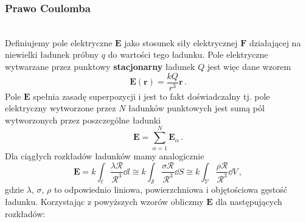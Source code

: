 \documentclass[../main.tex]{subfiles}
\begin{document}
\subsubsection{Prawo Coulomba}
\noindent{}\\

Definiujemy pole elektryczne \(\mathbf{E}\) jako stosunek siły elektrycznej \(\mathbf{F}\) działającej na niewielki ładunek próbny \(q\) do wartości tego ładunku. Pole elektryczne wytwarzane przez punktowy \textbf{stacjonarny} ładunek \(Q\) jest więc dane wzorem
\begin{equation*}
    \mathbf{E}(\mathbf{r})=\frac{kQ}{r^3}\mathbf{r}\,.
\end{equation*}
Pole \(\mathbf{E}\) spełnia zasadę superpozycji i jest to fakt doświadczalny tj. pole elektryczny wytworzone przez \(N\) ładunków punktowych jest sumą pól wytworzonych przez poszczególne ładunki
\begin{equation*}
    \mathbf{E}=\sum_{\alpha=1}^N\mathbf{E}_\alpha \,.
\end{equation*}
Dla ciągłych rozkładów ładunków mamy analogicznie
\begin{equation*}
    \mathbf{E}=k\int_\ell \frac{\lambda \boldsymbol{\mathcal{R}}}{\mathcal{R}^3}\dd{l}\cong k\int_\mathcal{S} \frac{\sigma \boldsymbol{{\mathcal{R}}}}{\mathcal{R}^3}\dd{S}\cong k\int_\mathcal{V} \frac{\rho \boldsymbol{{\mathcal{R}}}}{\mathcal{R}^3}\dd{V}\,,
\end{equation*}
gdzie \(\lambda\), \(\sigma\), \(\rho\) to odpowiednio liniowa, powierzchniowa i objętościowa gęstość ładunku. Korzystając z powyższych wzorów obliczmy \(\mathbf{E}\) dla następujących rozkładów:
\end{document}
